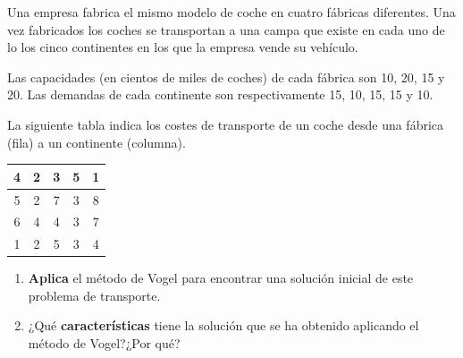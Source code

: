 Una empresa fabrica el mismo modelo de coche en cuatro fábricas diferentes. Una vez fabricados los coches se transportan a una campa que existe en cada uno de lo los cinco continentes en los que la empresa vende su vehículo.

Las capacidades (en cientos de miles de coches) de cada fábrica son 10, 20, 15 y 20. Las demandas de cada continente son respectivamente 15, 10, 15, 15 y 10.

La siguiente tabla indica los costes de transporte de un coche desde una fábrica (fila) a un continente (columna).

\begin{table}[h]
\begin{center}
\begin{tabular}{|c|c|c|c|c|}
\hline
4 & 2 & 3 & 5 & 1 \\ \hline
5 & 2 & 7 & 3 & 8 \\ \hline
6 & 4 & 4 & 3 & 7 \\ \hline
1 & 2 & 5 & 3 & 4 \\ \hline
\end{tabular}
\end{center}
\end{table}

\begin{enumerate}
    \item \textbf{Aplica} el método de Vogel para encontrar una solución inicial de este problema de transporte.
    \item ¿Qué \textbf{características} tiene la solución que se ha obtenido aplicando el método de Vogel?¿Por qué?
\end{enumerate}




